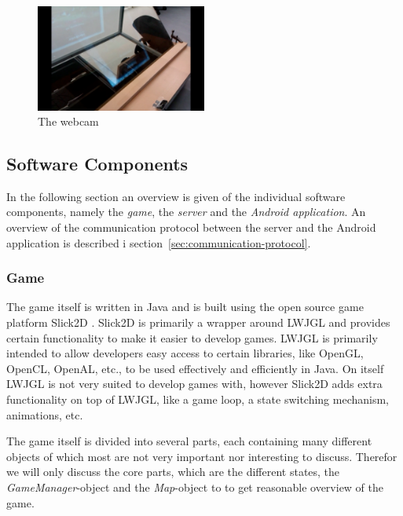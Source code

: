 \documentclass[a4paper,10pt]{report}
\begin{document}
		\begin{figure}[h!]
		\caption{The webcam}
		\centering
		\includegraphics[width=0.5\textwidth]{images/webcam}
		\end{figure}

	\subsection{Software Components}
	\label{sec:software-components}
	In the following section an overview is given of the individual software components, namely the \emph{game}, the \emph{server} and the \emph{Android application}.
	An overview of the communication protocol between the server and the Android application is described i section~\ref{sec:communication-protocol}.

		\subsubsection{Game}
		The game itself is written in Java and is built using the open source game platform Slick2D \cite{Slick2D}.
		Slick2D is primarily a wrapper around LWJGL \cite{LWJGL} and provides certain functionality to make it easier to develop games.
		LWJGL is primarily intended to allow developers easy access to certain libraries, like OpenGL, OpenCL, OpenAL, etc., to be used effectively and efficiently in Java.
		On itself LWJGL is not very suited to develop games with, however Slick2D adds extra functionality on top of LWJGL, like a game loop, a state switching mechanism, animations, etc.
		
		The game itself is divided into several parts, each containing many different objects of which most are not very important nor interesting to discuss.
		Therefor we will only discuss the core parts, which are the different states, the \emph{GameManager}-object and the \emph{Map}-object to to get reasonable overview of the game.
		
\end{document}
